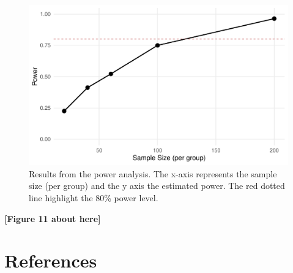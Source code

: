 \documentclass[
  man, mask,floatsintext]{apa6}
\begin{document}
\normalsize

\scriptsize

\begin{figure}

{\centering \includegraphics[width=1\linewidth]{paper_files/figure-latex/fig-power-curve-1} 

}

\caption{Results from the power analysis. The x-axis represents the sample size (per group) and the y axis the estimated power. The red dotted line highlight the 80\% power level.}\label{fig:fig-power-curve}
\end{figure}

\begin{center}\textbf{[Figure 11 about here]} \end{center}

\normalsize

\newpage

\section{References}\label{references}
\end{document}
